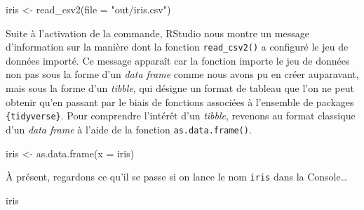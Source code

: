 \documentclass[
  letterpaper,
]{book}
\newenvironment{Shaded}{\begin{snugshade}}{\end{snugshade}}
\newcommand{\AttributeTok}[1]{\textcolor[rgb]{0.40,0.45,0.13}{#1}}
\newcommand{\FunctionTok}[1]{\textcolor[rgb]{0.28,0.35,0.67}{#1}}
\newcommand{\NormalTok}[1]{\textcolor[rgb]{0.00,0.23,0.31}{#1}}
\newcommand{\OtherTok}[1]{\textcolor[rgb]{0.00,0.23,0.31}{#1}}
\newcommand{\StringTok}[1]{\textcolor[rgb]{0.13,0.47,0.30}{#1}}
\begin{document}
\begin{Shaded}
\begin{Highlighting}[]
\NormalTok{iris }\OtherTok{\textless{}{-}} \FunctionTok{read\_csv2}\NormalTok{(}\AttributeTok{file =} \StringTok{"out/iris.csv"}\NormalTok{)}
\end{Highlighting}
\end{Shaded}

Suite à l'activation de la commande, RStudio nous montre un message
d'information sur la manière dont la fonction \texttt{read\_csv2()} a
configuré le jeu de données importé. Ce message apparaît car la fonction
importe le jeu de données non pas sous la forme d'un \emph{data frame}
comme nous avons pu en créer auparavant, mais sous la forme d'un
\emph{tibble}, qui désigne un format de tableau que l'on ne peut obtenir
qu'en passant par le biais de fonctions associées à l'ensemble de
packages \texttt{\{tidyverse\}}. Pour comprendre l'intérêt d'un
\emph{tibble}, revenons au format classique d'un \emph{data frame} à
l'aide de la fonction \texttt{as.data.frame()}.

\begin{Shaded}
\begin{Highlighting}[]
\NormalTok{iris }\OtherTok{\textless{}{-}} \FunctionTok{as.data.frame}\NormalTok{(}\AttributeTok{x =}\NormalTok{ iris)}
\end{Highlighting}
\end{Shaded}

À présent, regardons ce qu'il se passe si on lance le nom \texttt{iris}
dans la Console\ldots{}

\begin{Shaded}
\begin{Highlighting}[]
\NormalTok{iris}
\end{Highlighting}
\end{Shaded}
\end{document}

